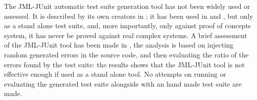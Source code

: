 \documentclass[english]{lni}
\begin{document}
The JML-JUnit automatic test suite generation tool has not been widely used or assessed. 
It is described by its own creators in \cite{Cheon2002,Cheon2004,Cheon2005}; it has been used in \cite{Oriat2004} and \cite{Cheon2005}, but only as a stand alone test suite, and, more importantly, only against proof of concepts system, it has never be proved against real complex systems.  
A brief assessment of the JML-JUnit tool has been made in \cite{Tan2004}, the analysis is based on injecting random generated errors in the source code, and then evaluating the ratio of the errors found by the test suite: the results shows that the JML-JUnit tool is not effective enough if used as a stand alone tool. 
No attempts on running or evaluating the generated test suite alongside with an hand made test suite are made.
\end{document}
